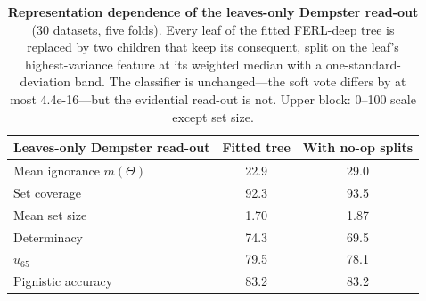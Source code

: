 \begin{table}[t]
\centering
\footnotesize
\setlength{\tabcolsep}{3pt}
\caption{\textbf{Representation dependence of the leaves-only Dempster read-out} (30 datasets, five folds). Every leaf of the fitted FERL-deep tree is replaced by two children that keep its consequent, split on the leaf's highest-variance feature at its weighted median with a one-standard-deviation band. The classifier is unchanged---the soft vote differs by at most 4.4e-16---but the evidential read-out is not. Upper block: 0--100 scale except set size.}
\label{tab:noop}
\begin{tabular}{@{}lcc@{}}
\toprule
Leaves-only Dempster read-out & Fitted tree & With no-op splits\\
\midrule
Mean ignorance $m(\Theta)$ & 22.9 & 29.0\\
Set coverage & 92.3 & 93.5\\
Mean set size & 1.70 & 1.87\\
Determinacy & 74.3 & 69.5\\
$u_{65}$ & 79.5 & 78.1\\
Pignistic accuracy & 83.2 & 83.2\\
\bottomrule
\end{tabular}
\end{table}
